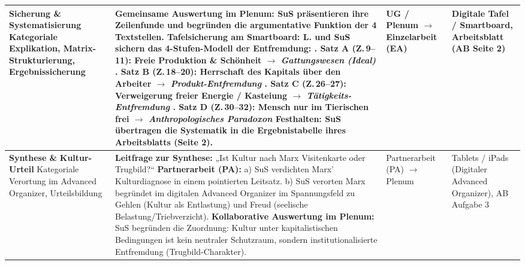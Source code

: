 \documentclass[a4paper, fontsize=9pt, landscape]{scrartcl}
\begin{document}
\begin{tabularx}{\textwidth}{|p{3.2cm}|X|p{3.0cm}|p{3.4cm}|}
\textbf{Sicherung \&} \newline \textbf{Systematisierung} \newline
\tiny\color{primaryBlue} Kategoriale Explikation, \newline Matrix-Strukturierung, \newline Ergebnissicherung & 
\textbf{Gemeinsame Auswertung im Plenum:} SuS präsentieren ihre Zeilenfunde und begründen die argumentative Funktion der 4 Textstellen. \newline
\textbf{Tafelsicherung am Smartboard:} L. und SuS sichern das 4-Stufen-Modell der Entfremdung: \newline
1. Satz A (Z.\,9--11): Freie Produktion \& Schönheit $\rightarrow$ \textit{Gattungswesen (Ideal)} \newline
2. Satz B (Z.\,18--20): Herrschaft des Kapitals über den Arbeiter $\rightarrow$ \textit{Produkt-Entfremdung} \newline
3. Satz C (Z.\,26--27): Verweigerung freier Energie / Kasteiung $\rightarrow$ \textit{Tätigkeits-Entfremdung} \newline
4. Satz D (Z.\,30--32): Mensch nur im Tierischen frei $\rightarrow$ \textit{Anthropologisches Paradoxon} \newline
\textbf{Festhalten:} SuS übertragen die Systematik in die Ergebnistabelle ihres Arbeitsblatts (Seite 2). & 
UG / Plenum $\rightarrow$ \newline
Einzelarbeit (EA) & 
Digitale Tafel / \newline
Smartboard, \newline
Arbeitsblatt (AB Seite 2) \\
\hline

\textbf{Synthese \&} \newline \textbf{Kultur-Urteil} \newline
\tiny\color{primaryBlue} Kategoriale Verortung \newline im Advanced Organizer, \newline Urteilsbildung & 
\textbf{Leitfrage zur Synthese:} „Ist Kultur nach Marx Visitenkarte oder Trugbild?“ \newline
\textbf{Partnerarbeit (PA):} \newline
a) SuS verdichten Marx’ Kulturdiagnose in einem pointierten Leitsatz. \newline
b) SuS verorten Marx begründet im digitalen Advanced Organizer im Spannungsfeld zu Gehlen (Kultur als Entlastung) und Freud (seelische Belastung/Triebverzicht). \newline
\textbf{Kollaborative Auswertung im Plenum:} SuS begründen die Zuordnung: Kultur unter kapitalistischen Bedingungen ist kein neutraler Schutzraum, sondern institutionalisierte Entfremdung (Trugbild-Charakter). & 
Partnerarbeit (PA) $\rightarrow$ \newline
Plenum & 
Tablets / iPads \newline
(Digitaler Advanced \newline
Organizer), \newline
AB Aufgabe 3 \\
\hline


\end{tabularx}
\end{document}
